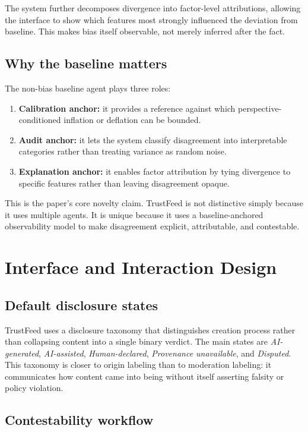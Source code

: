 \documentclass[acmlarge,screen,nonacm]{acmart}
\begin{document}
The system further decomposes divergence into factor-level attributions, allowing the interface to show which features most strongly influenced the deviation from baseline. This makes bias itself observable, not merely inferred after the fact.

\subsection{Why the baseline matters}

The non-bias baseline agent plays three roles:
\begin{enumerate}[leftmargin=1.5em]
    \item \textbf{Calibration anchor:} it provides a reference against which perspective-conditioned inflation or deflation can be bounded.
    \item \textbf{Audit anchor:} it lets the system classify disagreement into interpretable categories rather than treating variance as random noise.
    \item \textbf{Explanation anchor:} it enables factor attribution by tying divergence to specific features rather than leaving disagreement opaque.
\end{enumerate}

This is the paper's core novelty claim. TrustFeed is not distinctive simply because it uses multiple agents. It is unique because it uses a baseline-anchored observability model to make disagreement explicit, attributable, and contestable.

\section{Interface and Interaction Design}

\subsection{Default disclosure states}

TrustFeed uses a disclosure taxonomy that distinguishes creation process rather than collapsing content into a single binary verdict. The main states are \emph{AI-generated}, \emph{AI-assisted}, \emph{Human-declared}, \emph{Provenance unavailable}, and \emph{Disputed}. This taxonomy is closer to origin labeling than to moderation labeling: it communicates how content came into being without itself asserting falsity or policy violation.

\subsection{Contestability workflow}
\end{document}
